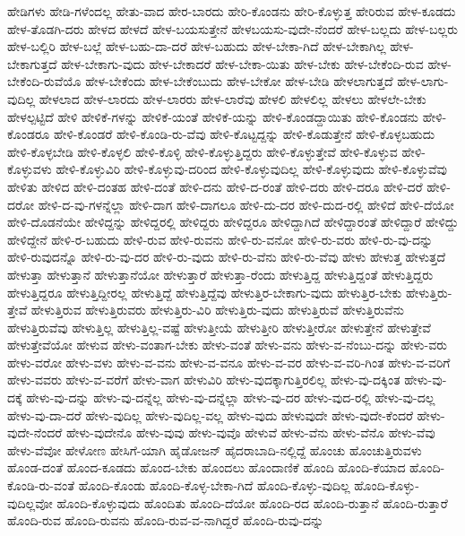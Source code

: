 {ಹೇಡಿಗಳು
ಹೇಡಿ-ಗಳೆಂದಲ್ಲ
ಹೇತು-ವಾದ
ಹೇರ-ಬಾರದು
ಹೇರಿ-ಕೊಂಡನು
ಹೇರಿ-ಕೊಳ್ಳುತ್ತ
ಹೇರಿರುವ
ಹೇಳ-ಕೂಡದು
ಹೇಳ-ತೊಡಗಿ-ದರು
ಹೇಳದ
ಹೇಳದೆ
ಹೇಳ-ಬಯಸುತ್ತೇನೆ
ಹೇಳಬಯಸು-ವುದೇ-ನೆಂದರೆ
ಹೇಳ-ಬಲ್ಲದು
ಹೇಳ-ಬಲ್ಲರು
ಹೇಳ-ಬಲ್ಲಿರಿ
ಹೇಳ-ಬಲ್ಲೆ
ಹೇಳ-ಬಹು-ದಾ-ದರೆ
ಹೇಳ-ಬಹುದು
ಹೇಳ-ಬೇಕಾ-ಗಿದೆ
ಹೇಳ-ಬೇಕಾಗಿಲ್ಲ
ಹೇಳ-ಬೇಕಾಗುತ್ತದೆ
ಹೇಳ-ಬೇಕಾಗು-ವುದು
ಹೇಳ-ಬೇಕಾದರೆ
ಹೇಳ-ಬೇಕಾ-ಯಿತು
ಹೇಳ-ಬೇಕು
ಹೇಳ-ಬೇಕೆಂದಿ-ರುವ
ಹೇಳ-ಬೇಕೆಂದಿ-ರುವೆಯೊ
ಹೇಳ-ಬೇಕೆಂದು
ಹೇಳ-ಬೇಕೆಂಬುದು
ಹೇಳ-ಬೇಕೋ
ಹೇಳ-ಬೇಡಿ
ಹೇಳಲಾಗುತ್ತದೆ
ಹೇಳ-ಲಾಗು-ವುದಿಲ್ಲ
ಹೇಳಲಾದ
ಹೇಳ-ಲಾರದು
ಹೇಳ-ಲಾರರು
ಹೇಳ-ಲಾರೆವು
ಹೇಳಲಿ
ಹೇಳಲಿಲ್ಲ
ಹೇಳಲು
ಹೇಳಲೇ-ಬೇಕು
ಹೇಳಲ್ಪಟ್ಟಿದೆ
ಹೇಳಿ
ಹೇಳಿಕೆ-ಗಳನ್ನು
ಹೇಳಿಕೆ-ಯಂತೆ
ಹೇಳಿಕೆ-ಯನ್ನು
ಹೇಳಿ-ಕೊಂಡದ್ದಾಯಿತು
ಹೇಳಿ-ಕೊಂಡನು
ಹೇಳಿ-ಕೊಂಡರೂ
ಹೇಳಿ-ಕೊಂಡರೆ
ಹೇಳಿ-ಕೊಂಡಿ-ರು-ವೆವು
ಹೇಳಿ-ಕೊಟ್ಟದ್ದನ್ನು
ಹೇಳಿ-ಕೊಡುತ್ತೇನೆ
ಹೇಳಿ-ಕೊಳ್ಳಬಹುದು
ಹೇಳಿ-ಕೊಳ್ಳಬೇಡಿ
ಹೇಳಿ-ಕೊಳ್ಳಲಿ
ಹೇಳಿ-ಕೊಳ್ಳಿ
ಹೇಳಿ-ಕೊಳ್ಳುತ್ತಿದ್ದರು
ಹೇಳಿ-ಕೊಳ್ಳುತ್ತೇವೆ
ಹೇಳಿ-ಕೊಳ್ಳುವ
ಹೇಳಿ-ಕೊಳ್ಳುವಳು
ಹೇಳಿ-ಕೊಳ್ಳುವಿರಿ
ಹೇಳಿ-ಕೊಳ್ಳುವು-ದರಿಂದ
ಹೇಳಿ-ಕೊಳ್ಳುವುದಿಲ್ಲ
ಹೇಳಿ-ಕೊಳ್ಳುವುದು
ಹೇಳಿ-ಕೊಳ್ಳುವೆವು
ಹೇಳಿತು
ಹೇಳಿದ
ಹೇಳಿ-ದಂತಹ
ಹೇಳಿ-ದಂತೆ
ಹೇಳಿ-ದನು
ಹೇಳಿ-ದ-ರಂತೆ
ಹೇಳಿ-ದರು
ಹೇಳಿ-ದರೂ
ಹೇಳಿ-ದರೆ
ಹೇಳಿ-ದರೋ
ಹೇಳಿ-ದ-ವು-ಗಳನ್ನೆಲ್ಲಾ
ಹೇಳಿ-ದಾಗ
ಹೇಳಿ-ದಾಗಲೂ
ಹೇಳಿ-ದು-ದರ
ಹೇಳಿ-ದುದ-ರಲ್ಲಿ
ಹೇಳಿದೆ
ಹೇಳಿ-ದೆಯೋ
ಹೇಳಿ-ದೊಡನೆಯೇ
ಹೇಳಿದ್ದನ್ನು
ಹೇಳಿದ್ದರಲ್ಲಿ
ಹೇಳಿದ್ದರು
ಹೇಳಿದ್ದರೂ
ಹೇಳಿದ್ದಾಗಿದೆ
ಹೇಳಿದ್ದಾರಂತೆ
ಹೇಳಿದ್ದಾರೆ
ಹೇಳಿದ್ದು
ಹೇಳಿದ್ದೇನೆ
ಹೇಳಿ-ರ-ಬಹುದು
ಹೇಳಿ-ರುವ
ಹೇಳಿ-ರುವನು
ಹೇಳಿ-ರು-ವನೋ
ಹೇಳಿ-ರು-ವರು
ಹೇಳಿ-ರು-ವು-ದನ್ನು
ಹೇಳಿ-ರುವುದನ್ನೊ
ಹೇಳಿ-ರು-ವು-ದರ
ಹೇಳಿ-ರು-ವುದು
ಹೇಳಿ-ರು-ವೆನು
ಹೇಳಿ-ರು-ವೆವು
ಹೇಳು
ಹೇಳುತ್ತ
ಹೇಳುತ್ತದೆ
ಹೇಳುತ್ತಾ
ಹೇಳುತ್ತಾನೆ
ಹೇಳುತ್ತಾನೆಯೋ
ಹೇಳುತ್ತಾರೆ
ಹೇಳುತ್ತಾ-ರೆಂದು
ಹೇಳುತ್ತಿದ್ದ
ಹೇಳುತ್ತಿದ್ದಂತೆ
ಹೇಳುತ್ತಿದ್ದರು
ಹೇಳುತ್ತಿದ್ದರೂ
ಹೇಳುತ್ತಿದ್ದೀರಲ್ಲ
ಹೇಳುತ್ತಿದ್ದೆ
ಹೇಳುತ್ತಿದ್ದೆವು
ಹೇಳುತ್ತಿರ-ಬೇಕಾಗು-ವುದು
ಹೇಳುತ್ತಿರ-ಬೇಕು
ಹೇಳುತ್ತಿರು-ತ್ತೇವೆ
ಹೇಳುತ್ತಿರುವ
ಹೇಳುತ್ತಿರುವರು
ಹೇಳುತ್ತಿರು-ವಿರಿ
ಹೇಳುತ್ತಿರು-ವುದು
ಹೇಳುತ್ತಿರುವೆ
ಹೇಳುತ್ತಿರುವೆನು
ಹೇಳುತ್ತಿರುವೆವು
ಹೇಳುತ್ತಿಲ್ಲ
ಹೇಳುತ್ತಿಲ್ಲ-ವಷ್ಟೆ
ಹೇಳುತ್ತೀಯೆ
ಹೇಳುತ್ತೀರಿ
ಹೇಳುತ್ತೀರೋ
ಹೇಳುತ್ತೇನೆ
ಹೇಳುತ್ತೇವೆ
ಹೇಳುತ್ತೇವೆಯೋ
ಹೇಳುವ
ಹೇಳು-ವಂತಾಗ-ಬೇಕು
ಹೇಳು-ವಂತೆ
ಹೇಳು-ವನು
ಹೇಳು-ವ-ನೆಂಬು-ದನ್ನು
ಹೇಳು-ವರು
ಹೇಳು-ವರೋ
ಹೇಳು-ವಳು
ಹೇಳು-ವ-ವನು
ಹೇಳು-ವ-ವನೂ
ಹೇಳು-ವ-ವರ
ಹೇಳು-ವ-ವರಿ-ಗಿಂತ
ಹೇಳು-ವ-ವರಿಗೆ
ಹೇಳು-ವವರು
ಹೇಳು-ವ-ವರೆಗೆ
ಹೇಳು-ವಾಗ
ಹೇಳುವಿರಿ
ಹೇಳು-ವುದಕ್ಕಾಗುತ್ತಿರಲಿಲ್ಲ
ಹೇಳು-ವು-ದಕ್ಕಿಂತ
ಹೇಳು-ವು-ದಕ್ಕೆ
ಹೇಳು-ವು-ದನ್ನು
ಹೇಳು-ವು-ದನ್ನೆಲ್ಲ
ಹೇಳು-ವು-ದನ್ನೆಲ್ಲಾ
ಹೇಳು-ವು-ದರ
ಹೇಳು-ವುದ-ರಲ್ಲಿ
ಹೇಳು-ವು-ದಲ್ಲ
ಹೇಳು-ವು-ದಾ-ದರೆ
ಹೇಳು-ವುದಿಲ್ಲ
ಹೇಳು-ವುದಿಲ್ಲ-ವಲ್ಲ
ಹೇಳು-ವುದು
ಹೇಳುವುದೇ
ಹೇಳು-ವುದೇ-ಕೆಂದರೆ
ಹೇಳು-ವುದೇ-ನೆಂದರೆ
ಹೇಳು-ವುದೇನೊ
ಹೇಳು-ವುವು
ಹೇಳು-ವುವೊ
ಹೇಳುವೆ
ಹೇಳು-ವೆನು
ಹೇಳು-ವೆನೊ
ಹೇಳು-ವೆವು
ಹೇಳು-ವೆವೋ
ಹೇಳೋಣ
ಹೇಸಿಗೆ-ಯಾಗಿ
ಹೈಡೋಜನ್
ಹೈದರಾಬಾದಿ-ನಲ್ಲಿದ್ದೆ
ಹೊಂಚು
ಹೊಂಚುತ್ತಿರುವಳು
ಹೊಂಡ-ದಂತೆ
ಹೊಂದ-ಕೂಡದು
ಹೊಂದ-ಬೇಕು
ಹೊಂದಲು
ಹೊಂದಾಣಿಕೆ
ಹೊಂದಿ
ಹೊಂದಿ-ಕೆಯಾದ
ಹೊಂದಿ-ಕೊಂಡಿ-ರು-ವಂತೆ
ಹೊಂದಿ-ಕೊಂಡು
ಹೊಂದಿ-ಕೊಳ್ಳ-ಬೇಕಾ-ಗಿದೆ
ಹೊಂದಿ-ಕೊಳ್ಳು-ವುದಿಲ್ಲ
ಹೊಂದಿ-ಕೊಳ್ಳು-ವುದಿಲ್ಲವೋ
ಹೊಂದಿ-ಕೊಳ್ಳುವುದು
ಹೊಂದಿತು
ಹೊಂದಿ-ದೆಯೋ
ಹೊಂದಿ-ರದ
ಹೊಂದಿ-ರುತ್ತಾನೆ
ಹೊಂದಿ-ರುತ್ತಾರೆ
ಹೊಂದಿ-ರುವ
ಹೊಂದಿ-ರುವನು
ಹೊಂದಿ-ರುವ-ವ-ನಾಗಿದ್ದರೆ
ಹೊಂದಿ-ರುವು-ದನ್ನು
}
